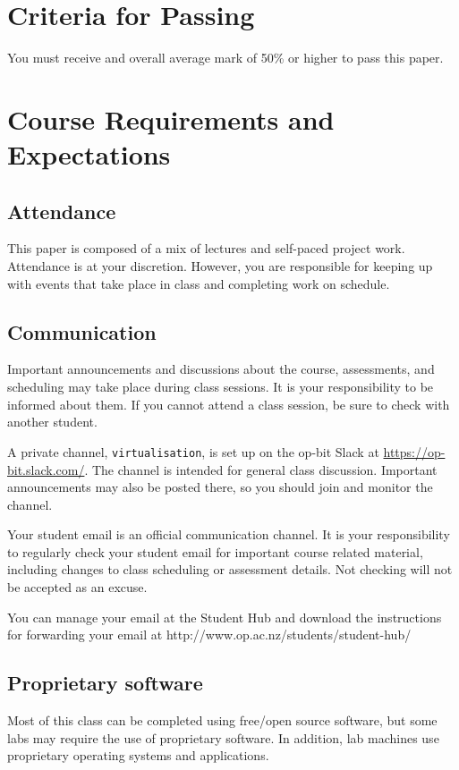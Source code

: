 \documentclass{article}
\begin{document}
\section*{Criteria for Passing}
You must receive and overall average mark of 50\% or higher to pass this paper.

\newpage

\section*{Course Requirements and Expectations}
\subsection*{Attendance}
This paper is composed of a mix of lectures and self-paced project work.  Attendance is at your discretion. 
However, you are responsible for keeping up with events that take place in class and completing work on schedule. 

\subsection*{Communication}
Important announcements and discussions about the course, assessments, and scheduling may take place during class sessions.  It is your responsibility to be informed about them.  If you cannot attend a class session, be sure to check with another student.

A private channel, \texttt{virtualisation}, is set up on the op-bit Slack at \url{https://op-bit.slack.com/}.  The channel is intended for general class discussion.  Important announcements may also be posted there, so you should join and monitor the channel.

Your student email is an official communication channel. It is your responsibility to regularly check your student email for important course related material, including changes to class scheduling or assessment details. Not checking will not be accepted as an excuse.

You can manage your email at the Student Hub and download the instructions for forwarding your email at http://www.op.ac.nz/students/student-hub/

\subsection*{Proprietary software}
Most of this class can be completed using free/open source software, but some labs may require the use of proprietary software.  In addition, lab machines use proprietary operating systems and applications.
\end{document}
